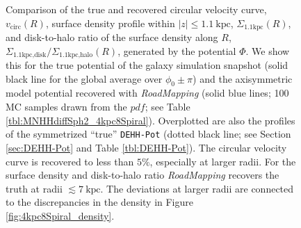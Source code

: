 \documentclass[iop,revtex4,numberedappendix,appendixfloats]{emulateapj}
\newcommand{\RM}{{\sl RoadMapping}}
\begin{document}
\begin{figure}[!htbp]
\centering
\caption{Comparison of the true and recovered circular velocity curve, $v_\text{circ}(R)$, surface density profile within $|z|\leq1.1~\text{kpc}$, $\Sigma_\text{1.1kpc}(R)$, and disk-to-halo ratio of the surface density along $R$, $\Sigma_\text{1.1kpc,disk}/\Sigma_\text{1.1kpc,halo}(R)$, generated by the potential $\Phi$. We show this for the true potential of the galaxy simulation snapshot (solid black line for the global average over $\phi_0\pm\pi$) and the axisymmetric model potential recovered with \RM{} (solid blue lines; 100 MC samples drawn from the $pdf$; see Table \ref{tbl:MNHHdiffSph2_4kpc8Spiral}). Overplotted are also the profiles of the symmetrized ``true'' \texttt{DEHH-Pot} (dotted black line; see Section \ref{sec:DEHH-Pot} and Table \ref{tbl:DEHH-Pot}). The circular velocity curve is recovered to less than $5\%$, especially at larger radii. For the surface density and disk-to-halo ratio \RM{} recovers the truth at radii $\lesssim 7~\text{kpc}$. The deviations at larger radii are connected to the discrepancies in the density in Figure \ref{fig:4kpc8Spiral_density}. }
\label{fig:4kpc8Spiral_vcirc_surfdens}
\end{figure}
\end{document}
